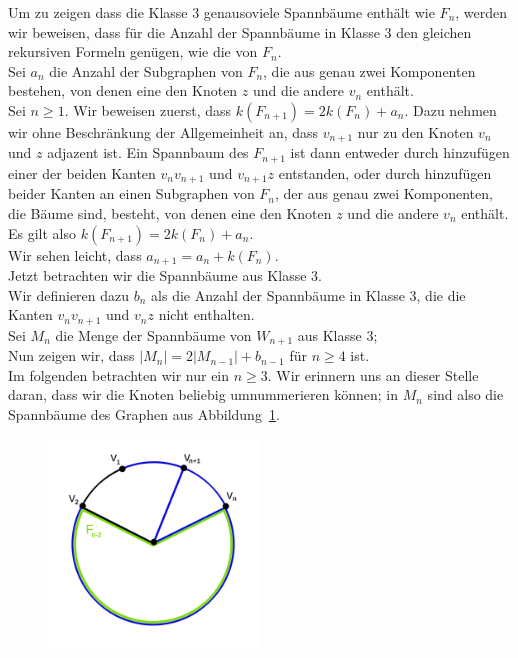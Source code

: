 Um zu zeigen dass die Klasse 3 genausoviele Spannbäume enthält wie $F_n$, werden wir beweisen, dass für die Anzahl der Spannbäume in Klasse 3 den gleichen rekursiven Formeln genügen, wie die von $F_n$.\\
Sei $a_n$ die Anzahl der Subgraphen von $F_n$, die aus genau zwei Komponenten bestehen, von denen eine den Knoten $z$ und die andere $v_n$ enthält.\\
Sei $n \geq 1$.
Wir beweisen zuerst, dass $\mathit{k}\left(F_{n+1}\right)=2\mathit{k}\left(F_{n}\right)+a_n$.
Dazu nehmen wir ohne Beschränkung der Allgemeinheit an, dass $v_{n+1}$ nur zu den Knoten $v_n$ und $z$ adjazent ist. Ein Spannbaum des $F_{n+1}$ ist dann entweder durch hinzufügen einer der beiden Kanten $v_nv_{n+1}$ und $v_{n+1}z$ entstanden, oder durch hinzufügen beider Kanten an einen Subgraphen von $F_n$, der aus genau zwei Komponenten, die Bäume sind, besteht, von denen eine den Knoten $z$ und die andere $v_n$ enthält.\\
Es gilt also $\mathit{k}\left(F_{n+1}\right)=2\mathit{k}\left(F_{n}\right)+a_n$.\\
Wir sehen leicht, dass $a_{n+1}=a_n+\mathit{k}\left(F_n\right)$.\\
Jetzt betrachten wir die Spannbäume aus Klasse 3.\\
Wir definieren dazu $b_n$ als die Anzahl der Spannbäume in Klasse 3, die die Kanten $v_nv_{n+1}$ und $v_{n}z$ nicht enthalten.\\
Sei $M_n$ die Menge der Spannbäume von $W_{n+1}$ aus Klasse 3;\\
Nun zeigen wir, dass $|M_{n}|=2|M_{n-1}|+b_{n-1}$ für $n \geq 4$ ist.\\
Im folgenden betrachten wir nur ein $n \geq 3$. Wir erinnern uns an dieser Stelle daran, dass wir die Knoten beliebig umnummerieren können; in $M_{n}$ sind also die Spannbäume des Graphen aus Abbildung~\ref{mn1}.
\begin{figure}[H]
  \centering
 \includegraphics[width=0.5\textwidth]{mn1.png}
 \caption{}
 \label{mn1} %
\end{figure}
